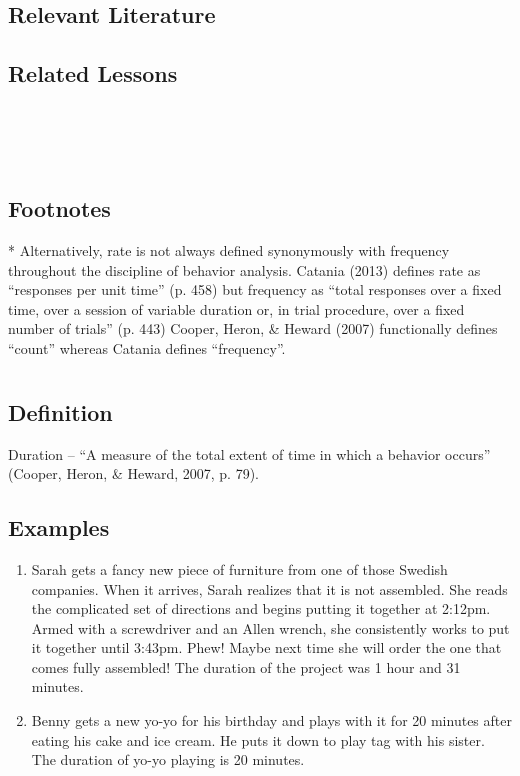 \section{Relevant Literature}
\begin{refsection}
\nocite{test,alang2017police,clayton2018black}
\printbibliography[heading=none]
\end{refsection}

\section{Related Lessons}
\fouriOne{}\\
\fourhOne{}\\
\fourFKFourtySeven{}\\

\section{Footnotes}
* Alternatively, rate is not always defined synonymously with frequency throughout the discipline of behavior analysis. Catania (2013) defines rate as ``responses per unit time'' (p. 458) but frequency as ``total responses over a fixed time, over a session of variable duration or, in trial procedure, over a fixed number of trials'' (p. 443) Cooper, Heron, \& Heward (2007) functionally defines ``count'' whereas Catania defines ``frequency''.

\chapter{\fouraThree{}}
\section{Definition}
Duration – ``A measure of the total extent of time in which a behavior occurs'' (Cooper, Heron, \& Heward, 2007, p. 79).
%
\section{Examples}
\begin{enumerate}
\item Sarah gets a fancy new piece of furniture from one of those Swedish companies.  When it arrives, Sarah realizes that it is not assembled.  She reads the complicated set of directions and begins putting it together at 2:12pm. Armed with a screwdriver and an Allen wrench, she consistently works to put it together until 3:43pm. Phew! Maybe next time she will order the one that comes fully assembled! The duration of the project was 1 hour and 31 minutes.
\item Benny gets a new yo-yo for his birthday and plays with it for 20 minutes after eating his cake and ice cream. He puts it down to play tag with his sister. The duration of yo-yo playing is 20 minutes.
\end{enumerate}
%
